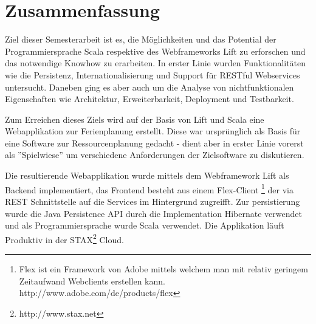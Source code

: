 \chapter{Zusammenfassung}
Ziel dieser Semesterarbeit ist es, die M\"oglichkeiten und das Potential der Programmiersprache Scala respektive des Webframeworks Lift zu erforschen und das notwendige Knowhow zu erarbeiten. In erster Linie wurden Funktionalit\"aten wie die Persistenz, Internationalisierung und Support f\"ur RESTful Webservices untersucht. Daneben ging es aber auch um die Analyse von nichtfunktionalen Eigenschaften wie Architektur, Erweiterbarkeit, Deployment und Testbarkeit.

Zum Erreichen dieses Ziels wird auf der Basis von Lift und Scala eine Webapplikation zur Ferienplanung erstellt. Diese war urspr\"unglich als Basis f\"ur eine Software zur Ressourcenplanung gedacht - dient aber in erster Linie vorerst als ''Spielwiese'' um verschiedene Anforderungen der Zielsoftware zu diskutieren.

Die resultierende Webapplikation wurde mittels dem Webframework Lift als Backend implementiert, das Frontend besteht aus einem Flex-Client \footnote{Flex ist ein Framework von Adobe mittels welchem man mit relativ geringem Zeitaufwand Webclients erstellen kann. http://www.adobe.com/de/products/flex} der via REST Schnittstelle auf die Services im Hintergrund zugreifft. Zur persistierung wurde die Java Persistence API durch die Implementation Hibernate verwendet und als Programmiersprache wurde Scala verwendet. Die Applikation l\"auft Produktiv in der STAX\footnote{http://www.stax.net} Cloud.